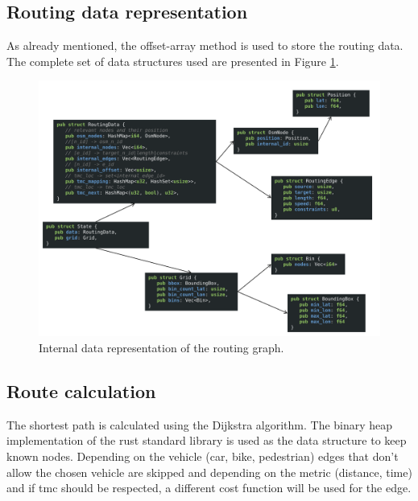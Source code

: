 \documentclass[a4paper]{scrartcl}
\begin{document}
\subsection{Routing data representation}
\label{data_representation}
As already mentioned, the offset-array method is used to store the routing data. The complete set of data structures used are presented in Figure \ref{data_routing}.

\begin{figure}[t]
\centering
\includegraphics[width=1.0\textwidth,page=1]{img/data_structures.pdf}
\caption{Internal data representation of the routing graph.}
\label{data_routing}
\end{figure}

\subsection{Route calculation}
The shortest path is calculated using the Dijkstra algorithm. The binary heap implementation of the rust standard library is used as the data structure to keep known nodes. Depending on the vehicle (car, bike, pedestrian) edges that don't allow the chosen vehicle are skipped and depending on the metric (distance, time) and if tmc should be respected, a different cost function will be used for the edge.
\end{document}
